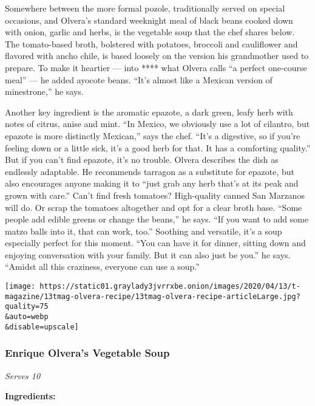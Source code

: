 Somewhere between the more formal pozole, traditionally served on
special occasions, and Olvera's standard weeknight meal of black beans
cooked down with onion, garlic and herbs, is the vegetable soup that the
chef shares below. The tomato-based broth, bolstered with potatoes,
broccoli and cauliflower and flavored with ancho chile, is based loosely
on the version his grandmother used to prepare. To make it heartier ---
into **** what Olvera calls ``a perfect one-course meal'' --- he added
ayocote beans. ``It's almost like a Mexican version of minestrone,'' he
says.

Another key ingredient is the aromatic epazote, a dark green, leafy herb
with notes of citrus, anise and mint. ``In Mexico, we obviously use a
lot of cilantro, but epazote is more distinctly Mexican,'' says the
chef. ``It's a digestive, so if you're feeling down or a little sick,
it's a good herb for that. It has a comforting quality.'' But if you
can't find epazote, it's no trouble. Olvera describes the dish as
endlessly adaptable. He recommends tarragon as a substitute for epazote,
but also encourages anyone making it to ``just grab any herb that's at
its peak and grown with care.'' Can't find fresh tomatoes? High-quality
canned San Marzanos will do. Or scrap the tomatoes altogether and opt
for a clear broth base. ``Some people add edible greens or change the
beans,'' he says. ``If you want to add some matzo balls into it, that
can work, too.'' Soothing and versatile, it's a soup especially perfect
for this moment. ``You can have it for dinner, sitting down and enjoying
conversation with your family. But it can also just be you.'' he says.
``Amidst all this craziness, everyone can use a soup.''

\texttt{[image: https://static01.graylady3jvrrxbe.onion/images/2020/04/13/t-magazine/13tmag-olvera-recipe/13tmag-olvera-recipe-articleLarge.jpg?quality=75\\\&auto=webp\\\&disable=upscale]}

\hypertarget{enrique-olveras-vegetable-soup}{%
\subsubsection{\texorpdfstring{\textbf{Enrique Olvera's Vegetable
Soup}}{Enrique Olvera's Vegetable Soup}}\label{enrique-olveras-vegetable-soup}}

\emph{Serves 10}

\textbf{Ingredients:}


